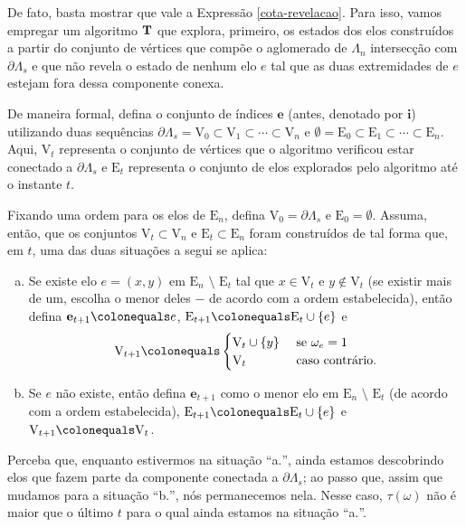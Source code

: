 \par De fato, basta mostrar que vale a Expressão \eqref{cota-revelacao}. Para isso, vamos empregar um algoritmo $\text{\textbf{T}}$ que explora, primeiro, os estados dos elos construídos a partir do conjunto de vértices que compõe o aglomerado de $\Lambda_n$ intersecção com $\partial\Lambda_s$ e que não revela o estado de nenhum elo $e$ tal que as duas extremidades de $e$ estejam fora dessa componente conexa.

\par De maneira formal, defina o conjunto de índices $\mathbf{e}$ (antes, denotado por $\mathbf{i}$) utilizando duas sequências $\partial\Lambda_s = \text{V}_0 \subset \text{V}_1 \subset \cdots \subset \text{V}_n$ e $\emptyset = \text{E}_0 \subset \text{E}_1 \subset \cdots \subset \text{E}_n$. Aqui, $\text{V}_t$ representa o conjunto de vértices que o algoritmo verificou estar conectado a $\partial\Lambda_s$ e $\text{E}_t$ representa o conjunto de elos explorados pelo algoritmo até o instante $t$.

\par Fixando uma ordem para os elos de $\text{E}_n$, defina $\text{V}_0 = \partial\Lambda_s$ e $\text{E}_0 = \emptyset$. Assuma, então, que os conjuntos $\text{V}_t \subset \text{V}_n$ e $\text{E}_t \subset \text{E}_n$ foram construídos de tal forma que, em $t$, uma das duas situações a segui se aplica:

\begin{enumerate}[a.]
	\item Se existe elo $e = (x, y)$ em $\text{E}_n \text{~\textbackslash~} \text{E}_t$ tal que $x \in \text{V}_t$ e $y \not\in \text{V}_t$ (se existir mais de um, escolha o menor deles $-$ de acordo com a ordem estabelecida), então defina $\mathbf{e}_{t+1} \colonequals e$, $\text{E}_{t + 1} \colonequals \text{E}_t \cup \{e\}$ e
	\[ \text{V}_{t + 1} \colonequals
	\begin{cases}
	\text{V}_t \cup \{y\} &\text{ se } \omega_e = 1 \\
	\text{V}_t &\text{ caso contrário}.
	\end{cases}
	\]
	\item Se $e$ não existe, então defina $\mathbf{e}_{t+1}$ como o menor elo em $\text{E}_n \text{~\textbackslash~} \text{E}_t$ (de acordo com a ordem estabelecida), $\text{E}_{t + 1} \colonequals \text{E}_t \cup \{e\}$ e $\text{V}_{t + 1} \colonequals \text{V}_t$.
\end{enumerate}

\par Perceba que, enquanto estivermos na situação ``a$.$'', ainda estamos descobrindo elos que fazem parte da componente conectada a $\partial\Lambda_s$; ao passo que, assim que mudamos para a situação ``b$.$'', nós permanecemos nela. Nesse caso, $\tau(\omega)$ não é maior que o último $t$ para o qual ainda estamos na situação ``a$.$''.

